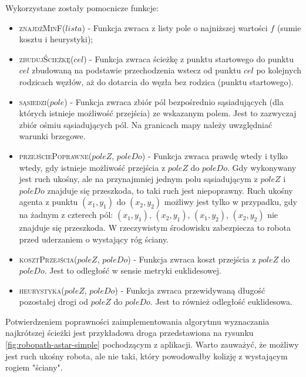 Wykorzystane zostały pomocnicze funkcje:
\begin{itemize}
	\item \textsc{znajdźMinF}($lista$) - Funkcja zwraca z listy pole o najniższej wartości $f$ (sumie kosztu i heurystyki);
	\item \textsc{zbudujŚcieżkę}($cel$) - Funkcja zwraca ścieżkę z punktu startowego do punktu $cel$ zbudowaną na podstawie przechodzenia wstecz od punktu $cel$ po kolejnych rodzicach węzłów, aż do dotarcia do węzła bez rodzica (punktu startowego).
	\item \textsc{sąsiedzi}($pole$) - Funkcja zwraca zbiór pól bezpośrednio sąsiadujących (dla których istnieje możliwość przejścia) ze wskazanym polem. Jest to zazwyczaj zbiór ośmiu sąsiadujących pól. Na granicach mapy należy uwzględniać warunki brzegowe.
	\item \textsc{przejściePoprawne}($poleZ$, $poleDo$) - Funkcja zwraca prawdę wtedy i tylko wtedy, gdy istnieje możliwość przejścia z $poleZ$ do $poleDo$. Gdy wykonywany jest ruch ukośny, ale na przynajmniej jednym polu sąsiadującym z $poleZ$ i $poleDo$ znajduje się przeszkoda, to taki ruch jest niepoprawny. Ruch ukośny agenta z punktu $(x_1, y_1)$ do $(x_2, y_2)$ możliwy jest tylko w przypadku, gdy na żadnym z czterech pól: $(x_1, y_1)$, $(x_2, y_1)$, $(x_1, y_2)$, $(x_2, y_2)$ nie znajduje się przeszkoda. W rzeczywistym środowisku zabezpiecza to robota przed uderzaniem o wystający róg ściany.
	\item \textsc{kosztPrzejścia}($poleZ$, $poleDo$) - Funkcja zwraca koszt przejścia z $poleZ$ do $poleDo$. Jest to odległość w sensie metryki euklidesowej.
	\item \textsc{heurystyka}($poleZ$, $poleDo$) - Funkcja zwraca przewidywaną długość pozostałej drogi od $poleZ$ do $poleDo$. Jest to również odległość euklidesowa.
\end{itemize}

Potwierdzeniem poprawności zaimplementowania algorytmu wyznaczania najkrótszej ścieżki jest przykładowa droga przedstawiona na rysunku \ref{fig:robopath-astar-simple} pochodzącym z aplikacji. Warto zauważyć, że możliwy jest ruch ukośny robota, ale nie taki, który powodowałby kolizję z wystającym rogiem "ściany".

